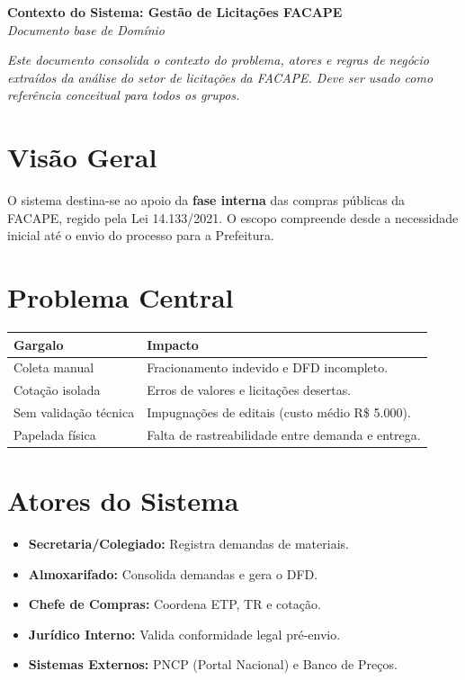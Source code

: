 \documentclass[a4paper,11pt]{article}
\begin{document}
\begin{center}
    {\huge \textbf{Contexto do Sistema: Gestão de Licitações FACAPE}} \\
    \vspace{0.2cm}
    {\large \textit{Documento base de Domínio}}
\end{center}

\begin{mdframed}[linecolor=gray, backgroundcolor=gray!10]
    \small \textit{Este documento consolida o contexto do problema, atores e regras de negócio extraídos da análise do setor de licitações da FACAPE. Deve ser usado como referência conceitual para todos os grupos.}
\end{mdframed}

\section{Visão Geral}
O sistema destina-se ao apoio da \textbf{fase interna} das compras públicas da FACAPE, regido pela Lei 14.133/2021. O escopo compreende desde a necessidade inicial até o envio do processo para a Prefeitura.

\section{Problema Central}
\begin{tabularx}{\textwidth}{@{}l X@{}}
    \toprule
    \textbf{Gargalo} & \textbf{Impacto} \\
    \midrule
    Coleta manual & Fracionamento indevido e DFD incompleto. \\
    Cotação isolada & Erros de valores e licitações desertas. \\
    Sem validação técnica & Impugnações de editais (custo médio R\$ 5.000). \\
    Papelada física & Falta de rastreabilidade entre demanda e entrega. \\
    \bottomrule
\end{tabularx}

\section{Atores do Sistema}
\begin{itemize}[label=\textcolor{facape_blue}{\textbullet}]
    \item \textbf{Secretaria/Colegiado:} Registra demandas de materiais.
    \item \textbf{Almoxarifado:} Consolida demandas e gera o DFD.
    \item \textbf{Chefe de Compras:} Coordena ETP, TR e cotação.
    \item \textbf{Jurídico Interno:} Valida conformidade legal pré-envio.
    \item \textbf{Sistemas Externos:} PNCP (Portal Nacional) e Banco de Preços.
\end{itemize}
\end{document}
